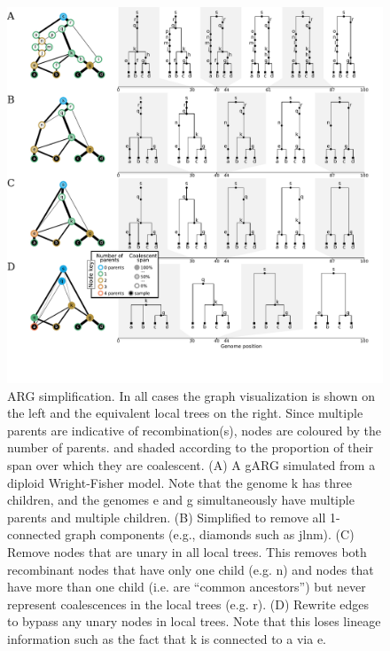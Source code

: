 \documentclass{article}
\begin{document}
\begin{figure}
\centering
\vspace{5em}
\includegraphics[width=\linewidth]{illustrations/simplification}
\caption{\label{fig-simplification}
ARG simplification. In all cases the graph visualization is shown on the left
and the equivalent local trees on the right. Since multiple parents are indicative of
recombination(s), nodes are coloured by the number of parents. and shaded
according to the proportion of their span over which they are coalescent.
(A) A gARG simulated from a diploid Wright-Fisher
model. Note that the genome \textsf{k} has three children, and the genomes
\textsf{e} and \textsf{g} simultaneously have multiple parents and multiple
children.
(B) Simplified to remove all
1-connected graph components (e.g., diamonds such as \textsf{jlnm}).
(C) Remove nodes that are unary in all local trees. This removes both recombinant nodes
that have only one child (e.g. \textsf{n}) and nodes that have more
than one child (i.e. are ``common ancestors'') but never represent coalescences
in the local trees (e.g. \textsf{r}).
(D) Rewrite edges to bypass any unary nodes in local trees. Note that this loses lineage
information such as the fact that \textsf{k} is connected to \textsf{a} via \textsf{e}.
}
\end{figure}
\end{document}

